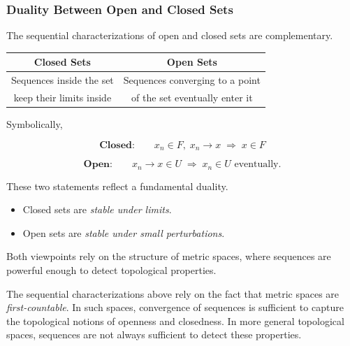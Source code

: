 \subsubsection{Duality Between Open and Closed Sets}

The sequential characterizations of open and closed sets
are complementary.

\begin{center}
\begin{tabular}{cc}
\toprule
\textbf{Closed Sets} & \textbf{Open Sets} \\
\midrule
Sequences inside the set & Sequences converging to a point \\
keep their limits inside & of the set eventually enter it \\
\bottomrule
\end{tabular}
\end{center}

\noindent Symbolically,

\[
\textbf{Closed:}
\qquad
x_n \in F,\; x_n \to x
\;\Rightarrow\;
x\in F
\]

\[
\textbf{Open:}
\qquad
x_n \to x \in U
\;\Rightarrow\;
x_n \in U
\text{ eventually.}
\]

\begin{remark}
These two statements reflect a fundamental duality.
\begin{itemize}
\item Closed sets are \emph{stable under limits}.
\item Open sets are \emph{stable under small perturbations}.
\end{itemize}
Both viewpoints rely on the structure of metric spaces,
where sequences are powerful enough to detect topological properties.
\end{remark}

\begin{remark}
\label{rem:first-countable}
The sequential characterizations above rely on the fact that metric
spaces are \emph{first-countable}.
In such spaces, convergence of sequences is sufficient to capture the
topological notions of openness and closedness.
In more general topological spaces, sequences are not always sufficient
to detect these properties.
\end{remark}

